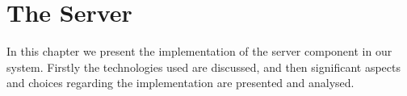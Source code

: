 \chapter{The Server}\label{cha:the_server}
In this chapter we present the implementation of the server component in our system.
Firstly the technologies used are discussed, and then significant aspects and choices regarding the implementation are presented and analysed.
